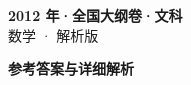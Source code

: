 \documentclass[zihao=-4, a4paper]{ctexart}
\begin{document}
\begin{center}
  {\Large\bfseries 2012 年·全国大纲卷·文科}\\[4pt]
  {\large 数学 · 解析版}
\end{center}
\medskip
{}

\clearpage
{}
\begin{center}{\Large\bfseries 参考答案与详细解析}\end{center}
\medskip

\end{document}
